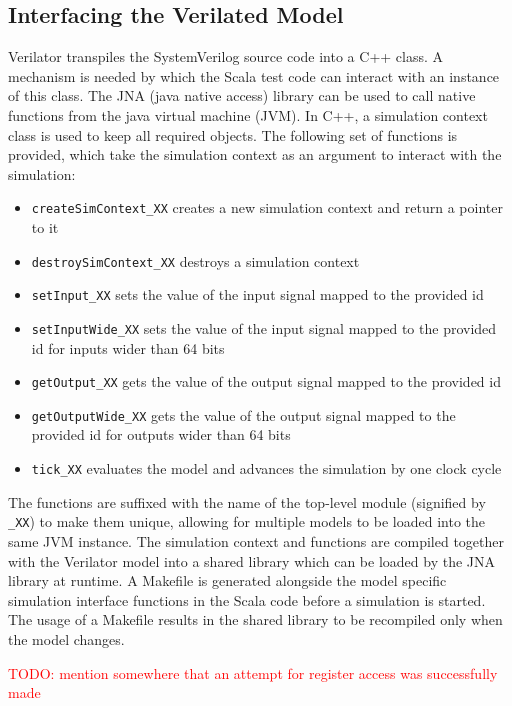 \documentclass[11pt,a4paper]{report}
\newcommand{\ttt}{\texttt}
\newcommand{\todo}[1]{\textcolor{red}{TODO: #1}}
\begin{document}
\subsection{Interfacing the Verilated Model} %

Verilator transpiles the SystemVerilog source code into a C++ class. A mechanism is needed by which the Scala test code can interact with an instance of this class. The JNA (java native access) library can be used to call native functions from the java virtual machine (JVM). In C++, a simulation context class is used to keep all required objects. The following set of functions is provided, which take the simulation context as an argument to interact with the simulation:


\begin{itemize}
  \item \ttt{createSimContext\_XX} creates a new simulation context and return a pointer to it
  \item \ttt{destroySimContext\_XX} destroys a simulation context
  \item \ttt{setInput\_XX} sets the value of the input signal mapped to the provided id
  \item \ttt{setInputWide\_XX} sets the value of the input signal mapped to the provided id for inputs wider than 64 bits
  \item \ttt{getOutput\_XX} gets the value of the output signal mapped to the provided id
  \item \ttt{getOutputWide\_XX} gets the value of the output signal mapped to the provided id for outputs wider than 64 bits
  \item \ttt{tick\_XX} evaluates the model and advances the simulation by one clock cycle
\end{itemize}

The functions are suffixed with the name of the top-level module (signified by \ttt{\_XX}) to make them unique, allowing for multiple models to be loaded into the same JVM instance. The simulation context and functions are compiled together with the Verilator model into a shared library which can be loaded by the JNA library at runtime. A Makefile is generated alongside the model specific simulation interface functions in the Scala code before a simulation is started. The usage of a Makefile results in the shared library to be recompiled only when the model changes.
  

\todo{mention somewhere that an attempt for register access was successfully made}
\end{document}
